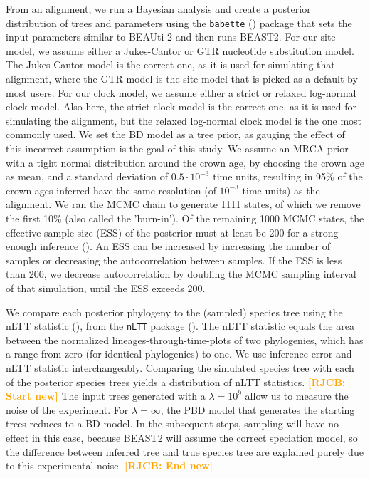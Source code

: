\documentclass{article}
\newcommand*\richel[1]{\textcolor{orange}{\textbf{[RJCB: #1]}}}
\begin{document}
From an alignment, we run a Bayesian analysis and 
create a posterior distribution of trees and parameters
using the \verb;babette; (\cite{babette}) package
that sets the input parameters similar to BEAUti 2 and then runs BEAST2. 
For our site model, we assume either a Jukes-Cantor or GTR nucleotide substitution model.
The Jukes-Cantor model is the correct one, as it is used for simulating that alignment,
where the GTR model is the site model that is picked as a default by most users.
For our clock model, we assume either a strict or relaxed log-normal 
clock model. 
Also here, the strict clock model is the correct one, as it is used for simulating the alignment,
but the relaxed log-normal clock model is the one most commonly used.
We set the BD model as a tree prior, 
as gauging the effect of this incorrect assumption is the goal of this study. 
We assume an MRCA prior with a tight normal distribution
around the crown age, by choosing the crown age as mean, and a standard deviation 
of $0.5 \cdot 10^{-3}$ time units,
resulting in 95\% of the crown ages inferred have the same resolution (of $10^{-3}$ time 
units) as the alignment. 
We ran the MCMC chain to generate 1111 states,
of which we remove the first 10\% (also called the 'burn-in'). 
Of the remaining
1000 MCMC states, the effective sample size (ESS) of the posterior 
must at least be 200
for a strong enough inference (\cite{beastbook}). An ESS can be increased by increasing
the number of samples or decreasing the autocorrelation between samples. 
If the ESS is less than 200, we decrease autocorrelation by doubling 
the MCMC sampling interval of that simulation, until the ESS exceeds 200.

We compare each posterior phylogeny to the (sampled) species tree
using the nLTT statistic (\cite{janzen2015}), from the \verb;nLTT; package (\cite{nltt}). 
The nLTT statistic equals the area between the normalized
lineages-through-time-plots of two phylogenies, which has a range 
from zero (for identical phylogenies) to one. We use inference error 
and nLTT statistic interchangeably. Comparing the simulated species tree
with each of the posterior species trees yields a distribution of nLTT statistics. 
\richel{Start new}
The input trees generated with a $\lambda = 10^9$ allow us to measure the noise of the experiment.
For $\lambda = \infty$, the PBD model that generates the starting trees reduces to a BD model.
In the subsequent steps, sampling will have no effect in this case, because BEAST2 will assume the correct speciation model,
so the difference between inferred tree and true species tree are explained purely due to this experimental noise.
\richel{End new}
\end{document}
